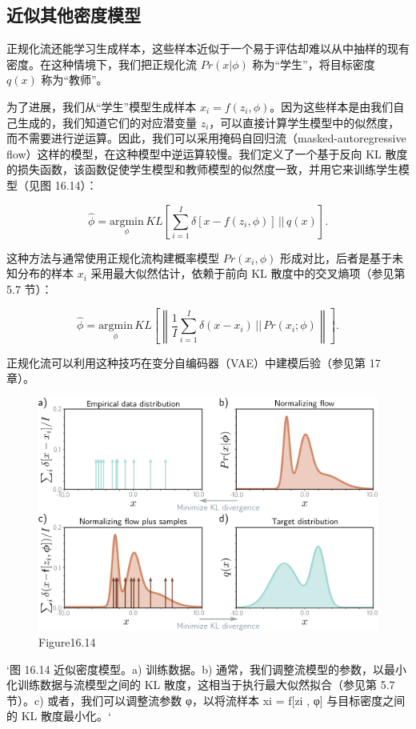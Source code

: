 \subsection{近似其他密度模型}
正规化流还能学习生成样本，这些样本近似于一个易于评估却难以从中抽样的现有密度。在这种情境下，我们把正规化流 \(Pr(x|\phi)\) 称为“学生”，将目标密度 \(q(x)\) 称为“教师”。

为了进展，我们从“学生”模型生成样本 \(x_i = f(z_i, \phi)\)。因为这些样本是由我们自己生成的，我们知道它们的对应潜变量 \(z_i\)，可以直接计算学生模型中的似然度，而不需要进行逆运算。因此，我们可以采用掩码自回归流（masked-autoregressive flow）这样的模型，在这种模型中逆运算较慢。我们定义了一个基于反向 KL 散度的损失函数，该函数促使学生模型和教师模型的似然度一致，并用它来训练学生模型（见图 16.14）：

\[
\hat{\phi} = \underset{\phi}{\text{argmin}} \, KL \left[ \sum_{i=1}^{I} \delta [x - f(z_i, \phi)] \, || \, q(x) \right]. \tag{16.25}
\]


这种方法与通常使用正规化流构建概率模型 \(Pr(x_i, \phi)\) 形成对比，后者是基于未知分布的样本 \(x_i\) 采用最大似然估计，依赖于前向 KL 散度中的交叉熵项（参见第 5.7 节）：

\[
\hat{\phi} = \underset{\phi}{\text{argmin}} \, KL \left[ \left\| \frac{1}{I} \sum_{i=1}^{I} \delta (x - x_i) \, || \, Pr(x_i; \phi) \right\| \right]. \tag{16.26}
\]


正规化流可以利用这种技巧在变分自编码器（VAE）中建模后验（参见第 17 章）。

\begin{figure}[h!]
\centering
\includegraphics[width=0.7\linewidth]{png/chapter16/FlowTypeII.png}
\caption{Figure16.14}
\end{figure}

`图 16.14 近似密度模型。a) 训练数据。b) 通常，我们调整流模型的参数，以最小化训练数据与流模型之间的 KL 散度，这相当于执行最大似然拟合（参见第 5.7 节）。c) 或者，我们可以调整流参数 φ，以将流样本 xi = f[zi , φ] 与目标密度之间的 KL 散度最小化。`

